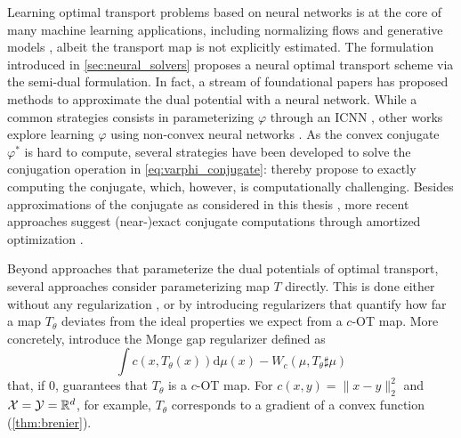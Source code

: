 Learning optimal transport problems based on neural networks is at the core of many machine learning applications, including normalizing flows \citep{rezende2015variational,huang2021convex} and generative models \citep{arjovsky2017wasserstein, genevay2018learning}, albeit the transport map is not explicitly estimated.
The formulation introduced in \cref{sec:neural_solvers} proposes a neural optimal transport scheme via the semi-dual formulation. In fact, a stream of foundational papers has proposed methods to approximate the dual potential with a neural network.
While a common strategies consists in parameterizing $\varphi$ through an \acrshort{ICNN} \citep{taghvaei20192, korotin2021wasserstein, makkuva2020optimal}, other works explore learning $\varphi$ using non-convex neural networks \citep{korotin2021neural, rout2021generative, nhan2019three}.
As the convex conjugate $\varphi^*$ is hard to compute, several strategies have been developed to solve the conjugation operation in \eqref{eq:varphi_conjugate}: \citet{taghvaei20192} thereby propose to exactly computing the conjugate, which, however, is computationally challenging. Besides approximations of the conjugate as considered in this thesis \citep{korotin2021wasserstein, makkuva2020optimal}, more recent approaches suggest (near-)exact conjugate computations through  amortized optimization \citep{amos2023amortizing}.

Beyond approaches that parameterize the dual potentials of optimal transport, several approaches consider parameterizing map $T$ directly. This is done either without any regularization \citep{yang2018scalable}, or by introducing regularizers that quantify how far a map $T_\theta$ deviates from the ideal properties we expect from a $c$-OT map.
More concretely, \citet{uscidda2023monge} introduce the Monge gap regularizer defined as
\begin{equation*}
	\int c(x, T_\theta(x)) \textrm{d} \mu(x) - W_c(\mu, T_\theta \sharp \mu)
\end{equation*}
that, if $0$, guarantees that $T_\theta$ is a $c$-OT map. For $c(x,y) = \|x-y\|^2_2$ and ${\mathcal{X}} = {\mathcal{Y}} = \mathbb{R}^d$, for example, $T_\theta$ corresponds to a gradient of a convex function (\cref{thm:brenier}).



